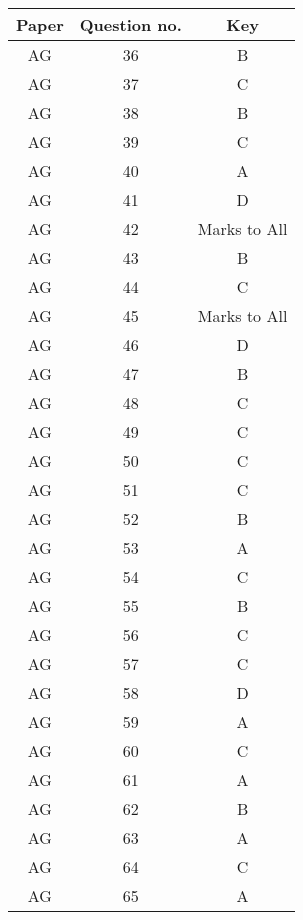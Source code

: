 \begin{minipage}[t]{0.45\textwidth}
\begin{tabular}{|c|c|c|}
\hline
Paper & Question no. & Key \\ \hline
AG & 36 & B \\ \hline
AG & 37 & C \\ \hline
AG & 38 & B \\ \hline
AG & 39 & C \\ \hline
AG & 40 & A \\ \hline
AG & 41 & D \\ \hline
AG & 42 & Marks to All \\ \hline
AG & 43 & B \\ \hline
AG & 44 & C \\ \hline
AG & 45 & Marks to All \\ \hline
AG & 46 & D \\ \hline
AG & 47 & B \\ \hline
AG & 48 & C \\ \hline
AG & 49 & C \\ \hline
AG & 50 & C \\ \hline
AG & 51 & C \\ \hline
AG & 52 & B \\ \hline
AG & 53 & A \\ \hline
AG & 54 & C \\ \hline
AG & 55 & B \\ \hline
AG & 56 & C \\ \hline
AG & 57 & C \\ \hline
AG & 58 & D \\ \hline
AG & 59 & A \\ \hline
AG & 60 & C \\ \hline
AG & 61 & A \\ \hline
AG & 62 & B \\ \hline
AG & 63 & A \\ \hline
AG & 64 & C \\ \hline
AG & 65 & A \\ \hline
\end{tabular}
\end{minipage}